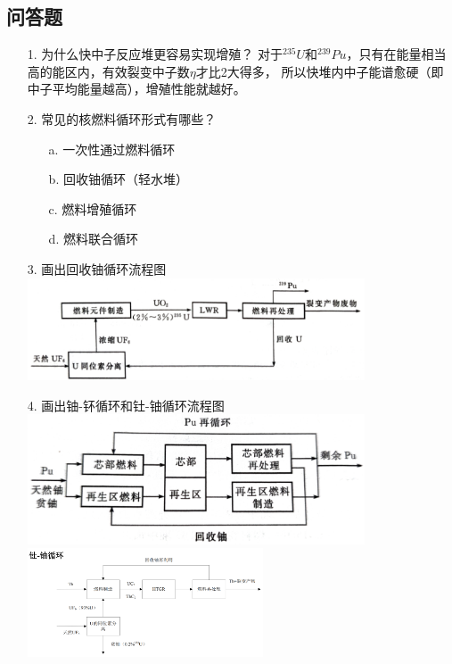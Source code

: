 \documentclass[openany]{ctexart}
\numberwithin{equation}{section} %
\begin{document}
\subsection{问答题}
\begin{itemize}
	\item [1.] 为什么快中子反应堆更容易实现增殖？\newline
		对于$^{235}U$和$^{239}Pu$，只有在能量相当高的能区内，有效裂变中子数$\eta$才比2大得多，
		所以快堆内中子能谱愈硬（即中子平均能量越高），增殖性能就越好。
		
	\vspace{1.5ex}
	
	\item [2.] 常见的核燃料循环形式有哪些？
	\begin{itemize}
		\item [a.]一次性通过燃料循环
		\item [b.]回收铀循环（轻水堆）
		\item [c.]燃料增殖循环
		\item [d.]燃料联合循环
	\end{itemize}
	
	\item [3.]画出回收铀循环流程图\newline
	\includegraphics[width=10cm]{resource/lwr.jpg}
	\item [4.]画出铀-钚循环和钍-铀循环流程图\newline
	\includegraphics[width=10cm]{resource/upu.jpg}\newline
	\includegraphics[width=7cm]{resource/tuu.png}

\end{itemize}
\end{document}
